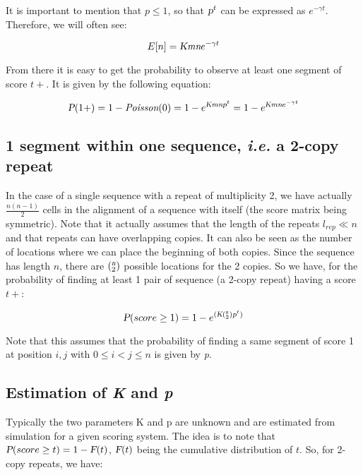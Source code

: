 \documentclass{ws-procs9x6}
\begin{document}
It is important to mention that $p \leq 1$, so that $\textsl{p}^{t}$ can be expressed as $e^{-\gamma t}$. Therefore,
we will often see:

\begin{equation}
E[n]=\textsl{K}\textit{mn}e^{-\gamma t}
\end{equation}

From there it is easy to get the probability to observe at least one segment of score $t+$.
It is given by the following equation:

\begin{equation}
\textsl{P}(1+) = 1-\textit{Poisson}(0) = 1-e^{\textsl{K}\textit{mn}\textsl{p}^{t}} = 1-e^{\textsl{K}\textit{mn}e^{-\gamma t}}
\end{equation}

\subsection{1 segment within one sequence, \textit{i.e.} a 2-copy repeat}
In the case of a single sequence with a repeat of multiplicity 2, we have actually $\frac{n(n-1)}{2}$
cells in the alignment of a sequence with itself (the score matrix being symmetric). Note
that it actually assumes that the length of the repeats $l_{rep}\ll n$ and that repeats can have
overlapping copies. It can also be seen as the number of locations where we can place the
beginning of both copies. Since the sequence has length $n$, there are $(_{2}^\textsl{n})$
possible locations for the 2 copies. So we have, for the probability of finding at least 1 pair of sequence (a
2-copy repeat) having a score $t+$:

\begin{equation}
\textsl{P}(score \geq 1) = 1-e^{(\textsl{K}(_{2}^\textsl{n})\textsl{p}^{t})}
\end{equation}

Note that this assumes that the probability of finding a same segment of score 1 at
position $i,j$ with $0 \leq i < j \leq n$ is given by \textsl{p}.

\subsection{Estimation of \textsl{K} and \textsl{p}}
Typically the two parameters K and p are unknown and are estimated from simulation for
a given scoring system. The idea is to note that $\textsl{P}(score \geq t) = 1 - \textsl{F}(t)$, $\textsl{F}(t)$ being the
cumulative distribution of $t$. So, for 2-copy repeats, we have:
\end{document}
